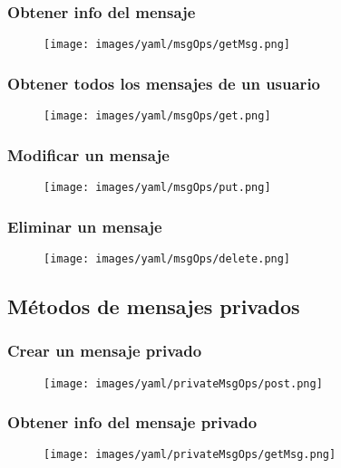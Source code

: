 \documentclass[12pt,a4paper, spanish]{article}
\begin{document}
\subsubsection{Obtener info del mensaje}
\begin{figure}[H]
	\centering
	\texttt{[image: images/yaml/msgOps/getMsg.png]}
\end{figure}
\subsubsection{Obtener todos los mensajes de un usuario}
\begin{figure}[H]
	\centering
	\texttt{[image: images/yaml/msgOps/get.png]}
\end{figure}
\subsubsection{Modificar un mensaje}
\begin{figure}[H]
	\centering
	\texttt{[image: images/yaml/msgOps/put.png]}
\end{figure}
\subsubsection{Eliminar un mensaje}
\begin{figure}[H]
	\centering
	\texttt{[image: images/yaml/msgOps/delete.png]}
\end{figure}

\newpage
\subsection{Métodos de mensajes privados}
\subsubsection{Crear un mensaje privado}
\begin{figure}[H]
	\centering
	\texttt{[image: images/yaml/privateMsgOps/post.png]}
\end{figure}
\subsubsection{Obtener info del mensaje privado}
\begin{figure}[H]
	\centering
	\texttt{[image: images/yaml/privateMsgOps/getMsg.png]}
\end{figure}
\end{document}
